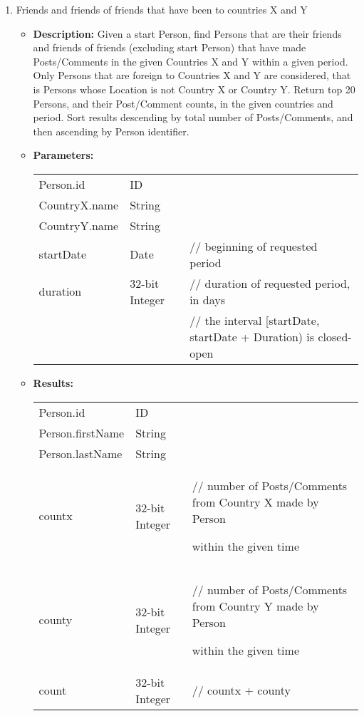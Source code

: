 {\begin{enumerate}
	\item Friends and friends of friends that have been to countries X and Y
	\begin{itemize}
		\item \textbf{Description:}
            Given a start Person, find Persons that are their friends and
            friends of friends (excluding start Person) that have made
            Posts/Comments in the given Countries X and Y within a given
            period.  Only Persons that are foreign to Countries X and Y are
            considered, that is Persons whose Location is not Country X or
            Country Y.  Return top 20 Persons, and their Post/Comment counts,
            in the given countries and period.  Sort results descending by
            total number of Posts/Comments, and then ascending by Person
            identifier.
		\item \textbf{Parameters:} \\
			\begin{tabular}{lll}
				Person.id 										& ID & \\
				CountryX.name									& String & \\
				CountryY.name									& String & \\
				startDate										& Date 	& // beginning of requested period \\
				duration										& 32-bit Integer 					& // duration of requested period, in days \\
                                                                &                                   & // the interval [startDate, startDate + Duration) is closed-open\\
			\end{tabular}		
		\item \textbf{Results:} \\
			\begin{tabular}{lll}
				Person.id 										& ID 	& \\
				Person.firstName 								& String 			& \\
				Person.lastName 								& String 			& \\
				countx 											& 32-bit Integer 	& \parbox[t]{20cm}{// number of Posts/Comments from Country X made by Person \par 
																					within the given time\strut} \\
				county 											& 32-bit Integer 	& \parbox[t]{20cm}{// number of Posts/Comments from Country Y made by Person \par 
																					within the given time\strut} \\
				count 											& 32-bit Integer 	& // countx + county \\
			\end{tabular}		
	\end{itemize}
		

\end{enumerate}}
